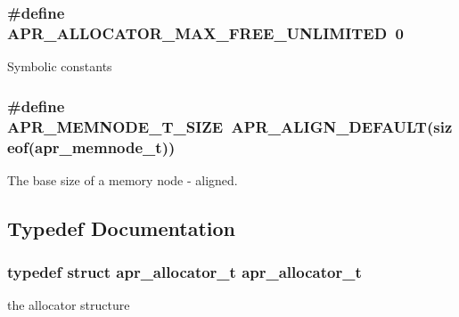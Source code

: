 \subsubsection[{\texorpdfstring{A\+P\+R\+\_\+\+A\+L\+L\+O\+C\+A\+T\+O\+R\+\_\+\+M\+A\+X\+\_\+\+F\+R\+E\+E\+\_\+\+U\+N\+L\+I\+M\+I\+T\+ED}{APR_ALLOCATOR_MAX_FREE_UNLIMITED}}]{\setlength{\rightskip}{0pt plus 5cm}\#define A\+P\+R\+\_\+\+A\+L\+L\+O\+C\+A\+T\+O\+R\+\_\+\+M\+A\+X\+\_\+\+F\+R\+E\+E\+\_\+\+U\+N\+L\+I\+M\+I\+T\+ED~0}\hypertarget{group__apr__allocator_ga54f32b19d8dad59bc6364a7a6b8ebec9}{}\label{group__apr__allocator_ga54f32b19d8dad59bc6364a7a6b8ebec9}
Symbolic constants 
\subsubsection[{\texorpdfstring{A\+P\+R\+\_\+\+M\+E\+M\+N\+O\+D\+E\+\_\+\+T\+\_\+\+S\+I\+ZE}{APR_MEMNODE_T_SIZE}}]{\setlength{\rightskip}{0pt plus 5cm}\#define A\+P\+R\+\_\+\+M\+E\+M\+N\+O\+D\+E\+\_\+\+T\+\_\+\+S\+I\+ZE~{\bf A\+P\+R\+\_\+\+A\+L\+I\+G\+N\+\_\+\+D\+E\+F\+A\+U\+LT}(sizeof({\bf apr\+\_\+memnode\+\_\+t}))}\hypertarget{group__apr__allocator_gaf382851817012929f4e2458b43f4482c}{}\label{group__apr__allocator_gaf382851817012929f4e2458b43f4482c}
The base size of a memory node -\/ aligned. 

\subsection{Typedef Documentation}
\subsubsection[{\texorpdfstring{apr\+\_\+allocator\+\_\+t}{apr_allocator_t}}]{\setlength{\rightskip}{0pt plus 5cm}typedef struct {\bf apr\+\_\+allocator\+\_\+t} {\bf apr\+\_\+allocator\+\_\+t}}\hypertarget{group__apr__allocator_ga1ceabfd30fcfc455e47d052d2a24244b}{}\label{group__apr__allocator_ga1ceabfd30fcfc455e47d052d2a24244b}
the allocator structure 
